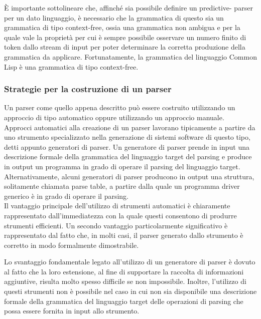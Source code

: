 È importante sottolineare che, affinché sia possibile definire un predictive-
parser per un dato linguaggio, è necessario che la grammatica di questo sia un
grammatica di tipo context-free, ossia una grammatica non ambigua e per la
quale vale la proprietà per cui è sempre possibile osservare un numero finito
di token dallo stream di input per poter determinare la corretta produzione
della grammatica da applicare. Fortunatamente, la grammatica del linguaggio
Common Lisp è una grammatica di tipo context-free.

\subsubsection{Strategie per la costruzione di un parser}

Un parser come quello appena descritto può essere costruito utilizzando un
approccio di tipo automatico oppure utilizzando un approccio manuale.\\

Approcci automatici alla creazione di un parser lavorano tipicamente a partire
da uno strumento specializzato nella generazione di sistemi software di questo
tipo, detti appunto generatori di parser. Un generatore di parser prende in
input una descrizione formale della grammatica del linguaggio target del
parsing e produce in output un programma in grado di operare il parsing del
linguaggio target. Alternativamente, alcuni generatori di parser producono in
output una struttura, solitamente chiamata parse table, a partire dalla quale
un programma driver generico è in grado di operare il parsing.\\

Il vantaggio principale dell’utilizzo di strumenti automatici è chiaramente
rappresentato dall’immediatezza con la quale questi consentono di produrre
strumenti efficienti. Un secondo vantaggio particolarmente significativo è
rappresentato dal fatto che, in molti casi, il parser generato dallo strumento
è corretto in modo formalmente dimostrabile.

Lo svantaggio fondamentale legato all'utilizzo di un generatore di parser è
dovuto al fatto che la loro estensione, al fine di supportare la raccolta di
informazioni aggiuntive, risulta molto spesso difficile se non impossibile.
Inoltre, l’utilizzo di questi strumenti non è possibile nel caso in cui non
sia disponibile una descrizione formale della grammatica del linguaggio target
delle operazioni di parsing che possa essere fornita in input allo
strumento.\\

